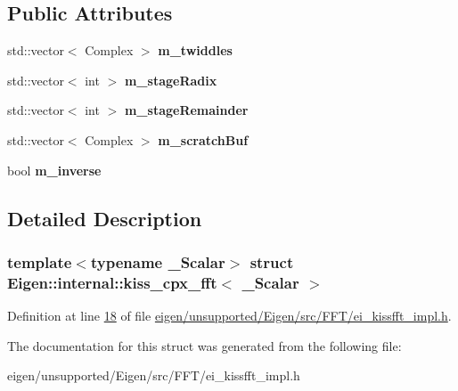 \subsection*{Public Attributes}
\begin{DoxyCompactItemize}
\item 
\mbox{\label{struct_eigen_1_1internal_1_1kiss__cpx__fft_a96e0fc12f7b01acc3e55a8f5f06a89dc}} 
std\+::vector$<$ Complex $>$ {\bfseries m\+\_\+twiddles}
\item 
\mbox{\label{struct_eigen_1_1internal_1_1kiss__cpx__fft_a2a3f3fa24eb4297d408635df03a52ab4}} 
std\+::vector$<$ int $>$ {\bfseries m\+\_\+stage\+Radix}
\item 
\mbox{\label{struct_eigen_1_1internal_1_1kiss__cpx__fft_a794354d7882d636509eb51e0ee9bc043}} 
std\+::vector$<$ int $>$ {\bfseries m\+\_\+stage\+Remainder}
\item 
\mbox{\label{struct_eigen_1_1internal_1_1kiss__cpx__fft_a6e7328ee5d963c3b7862684d5c31fc94}} 
std\+::vector$<$ Complex $>$ {\bfseries m\+\_\+scratch\+Buf}
\item 
\mbox{\label{struct_eigen_1_1internal_1_1kiss__cpx__fft_aa3b231f9307f37011a9cb168cdc0ffa0}} 
bool {\bfseries m\+\_\+inverse}
\end{DoxyCompactItemize}


\subsection{Detailed Description}
\subsubsection*{template$<$typename \+\_\+\+Scalar$>$\newline
struct Eigen\+::internal\+::kiss\+\_\+cpx\+\_\+fft$<$ \+\_\+\+Scalar $>$}



Definition at line \hyperlink{eigen_2unsupported_2_eigen_2src_2_f_f_t_2ei__kissfft__impl_8h_source_l00018}{18} of file \hyperlink{eigen_2unsupported_2_eigen_2src_2_f_f_t_2ei__kissfft__impl_8h_source}{eigen/unsupported/\+Eigen/src/\+F\+F\+T/ei\+\_\+kissfft\+\_\+impl.\+h}.



The documentation for this struct was generated from the following file\+:\begin{DoxyCompactItemize}
\item 
eigen/unsupported/\+Eigen/src/\+F\+F\+T/ei\+\_\+kissfft\+\_\+impl.\+h\end{DoxyCompactItemize}
